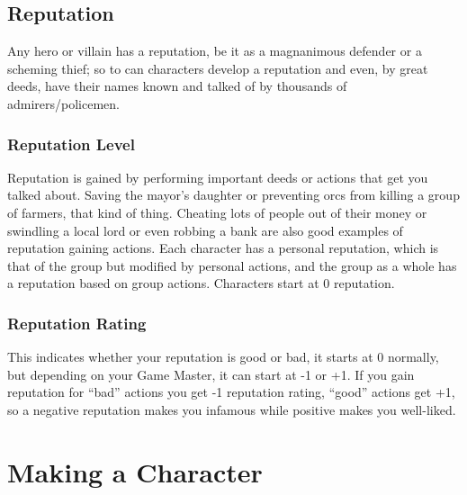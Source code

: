 \documentclass[a4paper,10pt,oneside]{book}
\begin{document}
\section{Reputation}
Any hero or villain has a reputation, be it as a magnanimous defender or a scheming thief; so to can characters develop a reputation and even, by great deeds, have their names known and talked of by thousands of admirers/policemen. 

\subsection{Reputation Level}
Reputation is gained by performing important deeds or actions that get you talked about. Saving the mayor's daughter or preventing orcs from killing a group of farmers, that kind of thing. Cheating lots of people out of their money or swindling a local lord or even robbing a bank are also good examples of reputation gaining actions.
Each character has a personal reputation, which is that of the group but modified by personal actions, and the group as a whole has a reputation based on group actions.
Characters start at 0 reputation.

\subsection{Reputation Rating}
This indicates whether your reputation is good or bad, it starts at 0 normally, but depending on your Game Master, it can start at -1 or +1. If you gain reputation for ``bad'' actions you get -1 reputation rating, ``good'' actions get +1, so a negative reputation makes you infamous while positive makes you well-liked.





\chapter{Making a Character}
\end{document}
